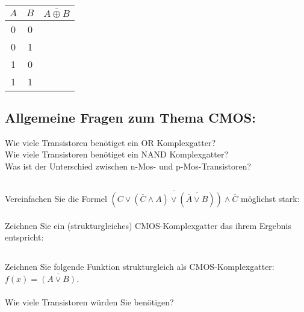 \begin{minipage}[r]{0.5\textwidth}
	\begin{center}
		\begin{tabular}{|c|c !{\vrule width 1.5pt} c|}\hline
			$A$&$B$& $\overline{A \oplus B}$\\\hline
			0&0&\\&1&\\\hline
			1&0&\\&1&\\\hline	
		\end{tabular}
	\end{center}
\end{minipage}

\subsection{Allgemeine Fragen zum Thema CMOS:}
Wie viele Transistoren benötiget ein OR Komplexgatter?\\[0.3cm]
Wie viele Transistoren benötiget ein NAND Komplexgatter?\\[0.3cm]
Was ist der Unterschied zwischen n-Mos- und p-Mos-Transistoren?\\
\subsection{}
Vereinfachen Sie die Formel $ \overline{\left(C \lor (\overline{C} \land A) \lor (\overline{\overline{A} \lor B})\right) \land \overline{C} } $ möglichst stark: \\
\\[0.3cm]
Zeichnen Sie ein (strukturgleiches) CMOS-Komplexgatter das ihrem Ergebnis entspricht:\\[0.3cm]

\subsection{}
Zeichnen Sie folgende Funktion strukturgleich als CMOS-Komplexgatter: $f(x)= \overline{(A \lor B)}$.\\
\\[0.3cm]
Wie viele Transistoren würden Sie benötigen? 